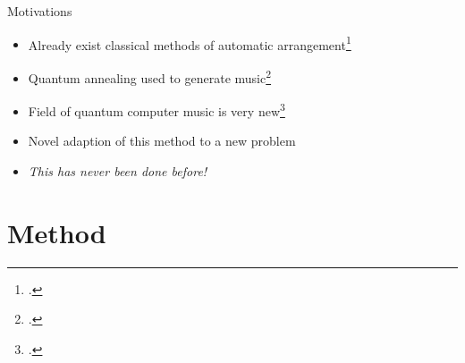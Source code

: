 \documentclass{beamer}
\begin{document}
\begin{frame}{Motivations}
    
    \begin{itemize}[<+(1)->]
        \item Already exist classical methods of automatic arrangement\footcite{huang_towards_2012,nakamura_statistical_2018,li_automatic_2019}
        \item Quantum annealing used to generate music\footcite{freedline_algorhythms_2021,arya_music_2022,}
        \item Field of quantum computer music is very new\footcite{miranda_quantum_2022}
        \item Novel adaption of this method to a new problem
        \item \emph{This has never been done before!}
    \end{itemize}
    
\end{frame}

\section{Method} %
\end{document}
